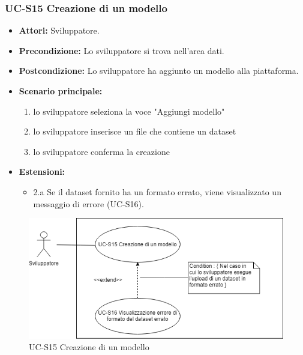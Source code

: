 	\subsubsection{UC-S15 Creazione di un modello}		
		\begin{itemize}
			\item \textbf{Attori:} Sviluppatore.
			\item \textbf{Precondizione:} Lo sviluppatore si trova nell'area dati.
			\item \textbf{Postcondizione:} Lo sviluppatore ha aggiunto un modello alla piattaforma.
			\item \textbf{Scenario principale:}
			\begin{enumerate}
				\item lo sviluppatore seleziona la voce "Aggiungi modello"
				\item lo sviluppatore inserisce un file che contiene un dataset
				\item lo sviluppatore conferma la creazione
			\end{enumerate}
			\item \textbf{Estensioni:}
				\begin{itemize}
					\item 2.a Se il dataset fornito ha un formato errato, viene visualizzato un messaggio di errore (UC-S16).
				\end{itemize}
		\end{itemize}
		
		\begin{figure}[h]
			\centering
			\includegraphics[scale=0.7]{images/UC-S15.png}
				\caption{UC-S15 Creazione di un modello}
		\end{figure}	
	
